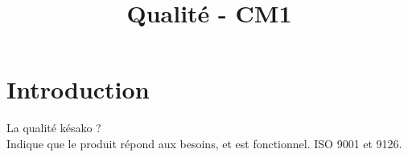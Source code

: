 \documentclass[11pt,a4paper]{article}
\title{Qualité - CM1}
\begin{document}
	
	\maketitle
	
	\section{Introduction}
	
	La qualité késako ?\\
	Indique que le produit répond aux besoins, et est fonctionnel.
	ISO 9001 et 9126.
\end{document}
